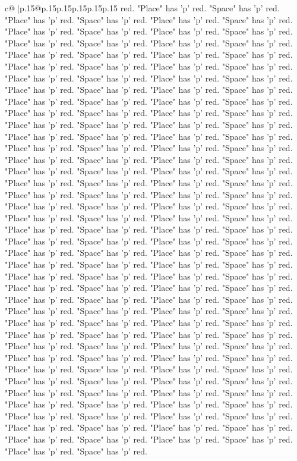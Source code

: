 \documentclass{article}
\begin{document}
{\begin{supertabular}{c@{$\;$}|p{.15\linewidth}@{}p{.15\linewidth}p{.15\linewidth}p{.15\linewidth}p{.15\linewidth}p{.15\linewidth}}
{{{red. "Place" has 'p' red. "Space" has 'p' red. "Place" has 'p' red. "Space" has 'p' red. "Place" has 'p' red. "Space" has 'p' red. "Place" has 'p' red. "Space" has 'p' red. "Place" has 'p' red. "Space" has 'p' red. "Place" has 'p' red. "Space" has 'p' red. "Place" has 'p' red. "Space" has 'p' red. "Place" has 'p' red. "Space" has 'p' red. "Place" has 'p' red. "Space" has 'p' red. "Place" has 'p' red. "Space" has 'p' red. "Place" has 'p' red. "Space" has 'p' red. "Place" has 'p' red. "Space" has 'p' red. "Place" has 'p' red. "Space" has 'p' red. "Place" has 'p' red. "Space" has 'p' red. "Place" has 'p' red. "Space" has 'p' red. "Place" has 'p' red. "Space" has 'p' red. "Place" has 'p' red. "Space" has 'p' red. "Place" has 'p' red. "Space" has 'p' red. "Place" has 'p' red. "Space" has 'p' red. "Place" has 'p' red. "Space" has 'p' red. "Place" has 'p' red. "Space" has 'p' red. "Place" has 'p' red. "Space" has 'p' red. "Place" has 'p' red. "Space" has 'p' red. "Place" has 'p' red. "Space" has 'p' red. "Place" has 'p' red. "Space" has 'p' red. "Place" has 'p' red. "Space" has 'p' red. "Place" has 'p' red. "Space" has 'p' red. "Place" has 'p' red. "Space" has 'p' red. "Place" has 'p' red. "Space" has 'p' red. "Place" has 'p' red. "Space" has 'p' red. "Place" has 'p' red. "Space" has 'p' red. "Place" has 'p' red. "Space" has 'p' red. "Place" has 'p' red. "Space" has 'p' red. "Place" has 'p' red. "Space" has 'p' red. "Place" has 'p' red. "Space" has 'p' red. "Place" has 'p' red. "Space" has 'p' red. "Place" has 'p' red. "Space" has 'p' red. "Place" has 'p' red. "Space" has 'p' red. "Place" has 'p' red. "Space" has 'p' red. "Place" has 'p' red. "Space" has 'p' red. "Place" has 'p' red. "Space" has 'p' red. "Place" has 'p' red. "Space" has 'p' red. "Place" has 'p' red. "Space" has 'p' red. "Place" has 'p' red. "Space" has 'p' red. "Place" has 'p' red. "Space" has 'p' red. "Place" has 'p' red. "Space" has 'p' red. "Place" has 'p' red. "Space" has 'p' red. "Place" has 'p' red. "Space" has 'p' red. "Place" has 'p' red. "Space" has 'p' red. "Place" has 'p' red. "Space" has 'p' red. "Place" has 'p' red. "Space" has 'p' red. "Place" has 'p' red. "Space" has 'p' red. "Place" has 'p' red. "Space" has 'p' red. "Place" has 'p' red. "Space" has 'p' red. "Place" has 'p' red. "Space" has 'p' red. "Place" has 'p' red. "Space" has 'p' red. "Place" has 'p' red. "Space" has 'p' red. "Place" has 'p' red. "Space" has 'p' red. "Place" has 'p' red. "Space" has 'p' red. "Place" has 'p' red. "Space" has 'p' red. "Place" has 'p' red. "Space" has 'p' red. "Place" has 'p' red. "Space" has 'p' red. "Place" has 'p' red. "Space" has 'p' red. "Place" has 'p' red. "Space" has 'p' red. "Place" has 'p' red. "Space" has 'p' red. "Place" has 'p' red. "Space" has 'p' red. "Place" has 'p' red. "Space" has 'p' red. "Place" has 'p' red. "Space" has 'p' red. "Place" has 'p' red. "Space" has 'p' red. "Place" has 'p' red. "Space" has 'p' red. "Place" has 'p' red. "Space" has 'p' red. "Place" has 'p' red. "Space" has 'p' red. "Place" has 'p' red. "Space" has 'p' red. "Place" has 'p' red. "Space" has 'p' red. "Place" has 'p' red. "Space" has 'p' red. "Place" has 'p' red. "Space" has 'p' red. }}}
\end{supertabular}}
\end{document}
